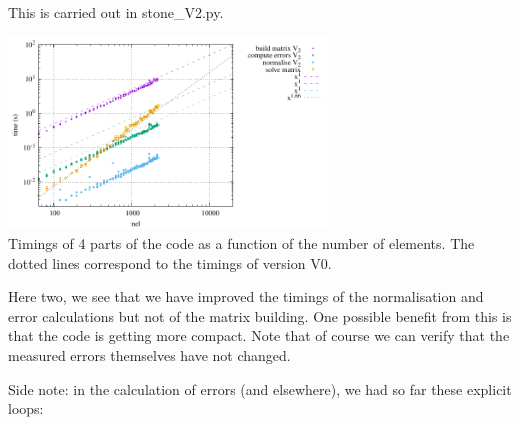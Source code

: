 This is carried out in {\pythonfile stone\_V2.py}.


\begin{center}
\includegraphics[width=8.5cm]{python_codes/fieldstone_150/results/times_V2}\\
{\captionfont Timings of 4 parts of the code as a function of the number of elements.
The dotted lines correspond to the timings of version V0.}
\end{center}

Here two, we see that we have improved the timings of the normalisation and 
error calculations but not of the matrix building. 
One possible benefit from this is that the code is getting more compact.
Note that of course we can verify that the measured errors themselves have not changed.
 
Side note: in the calculation of errors (and elsewhere), we had so far these explicit loops:

